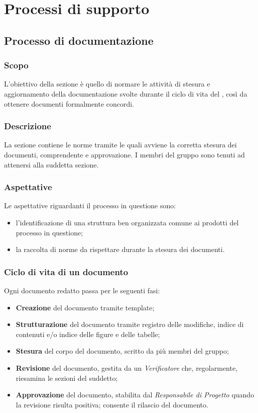 \section{Processi di supporto}
\subsection{Processo di documentazione}
\subsubsection{Scopo}
L'obiettivo della sezione è quello di normare le attività di stesura e aggiornamento della documentazione svolte durante il ciclo di vita del , così da ottenere documenti formalmente concordi.
\subsubsection{Descrizione}
La sezione contiene le norme tramite le quali avviene la corretta stesura dei documenti, comprendente  e approvazione. I membri del gruppo sono tenuti ad attenersi alla suddetta sezione.
\subsubsection{Aspettative}
Le aspettative riguardanti il processo in questione sono:
\begin{itemize}
	\item l'identificazione di una struttura ben organizzata comune ai prodotti del processo in questione;
	\item la raccolta di norme da rispettare durante la stesura dei documenti.
\end{itemize}
\subsubsection{Ciclo di vita di un documento}
Ogni documento redatto passa per le seguenti fasi:
\begin{itemize}
	\item \textbf{Creazione} del documento tramite template;
	\item \textbf{Strutturazione} del documento tramite registro delle modifiche, indice di contenuti e/o indice delle figure e delle tabelle;
	\item \textbf{Stesura} del corpo del documento, scritto da più membri del gruppo;
	\item \textbf{Revisione} del documento, gestita da un \textit{Verificatore} che, regolarmente, riesamina le sezioni del suddetto;
	\item \textbf{Approvazione} del documento, stabilita dal \textit{Responsabile di Progetto} quando la revisione risulta positiva; consente il rilascio del documento. 
\end{itemize}
